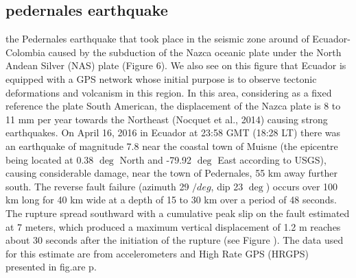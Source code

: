 \documentclass{gji}
\begin{document}
	\subsection{pedernales earthquake} 
the Pedernales earthquake that took place in the seismic zone around
of Ecuador-Colombia caused by the subduction of the Nazca oceanic plate under the
North Andean Silver (NAS) plate (Figure 6). We also see on this figure that Ecuador is
equipped with a GPS network whose initial purpose is to observe tectonic deformations and
volcanism in this region. In this area, considering as a fixed reference the plate
South American, the displacement of the Nazca plate is 8 to 11 mm per year towards the
Northeast (Nocquet et al., 2014) causing strong earthquakes.
On April 16, 2016 in Ecuador at 23:58 GMT (18:28 LT) there was an earthquake of magnitude
7.8 near the coastal town of Muisne (the epicentre being located at 0.38 $\deg$ North and -79.92 $\deg$ East according to
USGS), causing considerable damage, near the town of Pedernales, 55 km away
further south. The reverse fault failure (azimuth 29 $/deg$, dip 23 $\deg$) occurs over 100 km long for 40 km wide at a depth of 15 to 30 km over a period of 48 seconds. The
rupture spread southward with a cumulative peak slip on the fault estimated at 7
meters, which produced a maximum vertical displacement of 1.2 m reaches about 30 seconds
after the initiation of the rupture (see Figure ). The data used for this estimate are
from accelerometers and High Rate GPS (HRGPS) presented in fig.are p.

        
        
\end{document}

